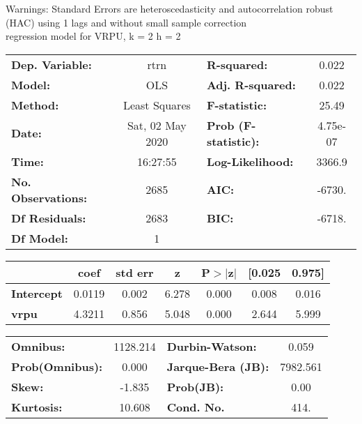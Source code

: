 Warnings: \newline
 [1] Standard Errors are heteroscedasticity and autocorrelation robust (HAC) using 1 lags and without small sample correction\\ 

regression model for VRPU, k = 2 h = 2\begin{center}
\begin{tabular}{lclc}
\toprule
\textbf{Dep. Variable:}    &       rtrn       & \textbf{  R-squared:         } &     0.022   \\
\textbf{Model:}            &       OLS        & \textbf{  Adj. R-squared:    } &     0.022   \\
\textbf{Method:}           &  Least Squares   & \textbf{  F-statistic:       } &     25.49   \\
\textbf{Date:}             & Sat, 02 May 2020 & \textbf{  Prob (F-statistic):} &  4.75e-07   \\
\textbf{Time:}             &     16:27:55     & \textbf{  Log-Likelihood:    } &    3366.9   \\
\textbf{No. Observations:} &        2685      & \textbf{  AIC:               } &    -6730.   \\
\textbf{Df Residuals:}     &        2683      & \textbf{  BIC:               } &    -6718.   \\
\textbf{Df Model:}         &           1      & \textbf{                     } &             \\
\bottomrule
\end{tabular}
\begin{tabular}{lcccccc}
                   & \textbf{coef} & \textbf{std err} & \textbf{z} & \textbf{P$> |$z$|$} & \textbf{[0.025} & \textbf{0.975]}  \\
\midrule
\textbf{Intercept} &       0.0119  &        0.002     &     6.278  &         0.000        &        0.008    &        0.016     \\
\textbf{vrpu}      &       4.3211  &        0.856     &     5.048  &         0.000        &        2.644    &        5.999     \\
\bottomrule
\end{tabular}
\begin{tabular}{lclc}
\textbf{Omnibus:}       & 1128.214 & \textbf{  Durbin-Watson:     } &    0.059  \\
\textbf{Prob(Omnibus):} &   0.000  & \textbf{  Jarque-Bera (JB):  } & 7982.561  \\
\textbf{Skew:}          &  -1.835  & \textbf{  Prob(JB):          } &     0.00  \\
\textbf{Kurtosis:}      &  10.608  & \textbf{  Cond. No.          } &     414.  \\
\bottomrule
\end{tabular}
\end{center}


